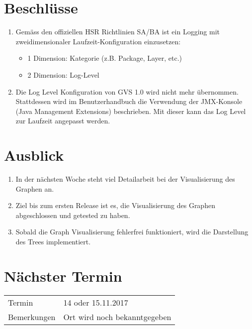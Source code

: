 \documentclass[11pt, a4paper,oneside]{scrartcl}
\begin{document}
\section{Beschlüsse}
\begin{enumerate}
	\item Gemäss den offiziellen HSR Richtlinien SA/BA ist ein Logging mit zweidimensionaler Laufzeit-Konfiguration einzusetzen:
	\begin{itemize}
		\item 1 Dimension: Kategorie (z.B. Package, Layer, etc.)
		\item 2 Dimension: Log-Level
	\end{itemize}
	\item Die Log Level Konfiguration von GVS 1.0 wird nicht mehr übernommen. Stattdessen wird im Benutzerhandbuch die Verwendung der JMX-Konsole (Java Management Extensions) beschrieben. Mit dieser kann das Log Level zur Laufzeit angepasst werden.
\end{enumerate} 

\section{Ausblick}
\begin{enumerate}
	\item In der nächsten Woche steht viel Detailarbeit bei der Visualisierung des Graphen an. 
	\item Ziel bis zum ersten Release ist es, die Visualisierung des Graphen abgeschlossen und getested zu haben.
	\item Sobald die Graph Visualisierung fehlerfrei funktioniert, wird die Darstellung des Trees implementiert.
\end{enumerate}

\section{Nächster Termin}
\begin{tabu} to \linewidth {l X }
	\toprule
	Termin & 14 oder 15.11.2017  \\
	Bemerkungen & Ort wird noch bekanntgegeben   \\
	\bottomrule
\end{tabu}
\end{document}
